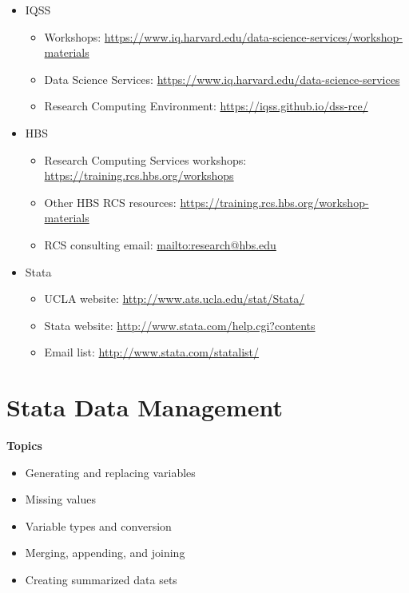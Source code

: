 \documentclass[
]{book}
\providecommand{\tightlist}{%
  \setlength{\itemsep}{0pt}\setlength{\parskip}{0pt}}
\begin{document}
\begin{itemize}
\tightlist
\item
  IQSS

  \begin{itemize}
  \tightlist
  \item
    Workshops: \url{https://www.iq.harvard.edu/data-science-services/workshop-materials}
  \item
    Data Science Services: \url{https://www.iq.harvard.edu/data-science-services}
  \item
    Research Computing Environment: \url{https://iqss.github.io/dss-rce/}
  \end{itemize}
\item
  HBS

  \begin{itemize}
  \tightlist
  \item
    Research Computing Services workshops: \url{https://training.rcs.hbs.org/workshops}
  \item
    Other HBS RCS resources: \url{https://training.rcs.hbs.org/workshop-materials}
  \item
    RCS consulting email: \url{mailto:research@hbs.edu}
  \end{itemize}
\item
  Stata

  \begin{itemize}
  \tightlist
  \item
    UCLA website: \url{http://www.ats.ucla.edu/stat/Stata/}
  \item
    Stata website: \url{http://www.stata.com/help.cgi?contents}
  \item
    Email list: \url{http://www.stata.com/statalist/}
  \end{itemize}
\end{itemize}

\hypertarget{stata-data-management}{%
\chapter{Stata Data Management}\label{stata-data-management}}

\textbf{Topics}

\begin{itemize}
\tightlist
\item
  Generating and replacing variables
\item
  Missing values
\item
  Variable types and conversion
\item
  Merging, appending, and joining
\item
  Creating summarized data sets
\end{itemize}
\end{document}
